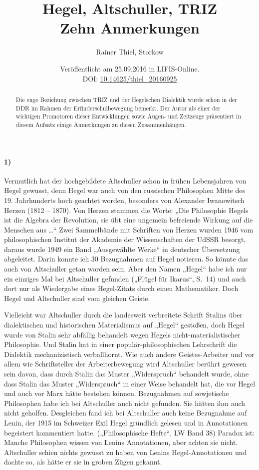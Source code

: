 \documentclass[12pt,a4paper]{article}
\title{Hegel, Altschuller, TRIZ\\[1em]\large Zehn Anmerkungen}
\author{Rainer Thiel, Storkow}
\date{Veröffentlicht am 25.09.2016 in LIFIS-Online.\\[4pt] DOI:
  \url{10.14625/thiel_20160925}}
\begin{document}
\maketitle

\begin{abstract}\noindent
  Die enge Beziehung zwischen TRIZ und der Hegelschen Dialektik wurde schon in
  der DDR im Rahmen der Erfinderschulbewegung bemerkt.  Der Autor als einer
  der wichtigen Promotoren dieser Entwicklungen sowie Augen- und Zeitzeuge
  präsentiert in diesem Aufsatz einige Anmerkungen zu diesen Zusammenhängen.   
\end{abstract}

\paragraph{1)} 
Vermutlich hat der hochgebildete Altschuller schon in frühen Lebensjahren von
Hegel gewusst, denn Hegel war auch von den russischen Philosophen Mitte des
19. Jahrhunderts hoch geachtet worden, besonders von Alexander Iwanowitsch
Herzen (1812 – 1870). Von Herzen stammen die Worte: „Die Philosophie Hegels ist
die Algebra der Revolution, sie übt eine ungemein befreiende Wirkung auf die
Menschen aus …“ Zwei Sammelbände mit Schriften von Herzen wurden 1946 vom
philosophischen Institut der Akademie der Wissenschaften der UdSSR besorgt,
daraus wurde 1949 ein Band „Ausgewählte Werke“ in deutscher Übersetzung
abgeleitet. Darin konnte ich 30 Bezugnahmen auf Hegel notieren. So könnte das
auch von Altschuller getan worden sein. Aber den Namen „Hegel“ habe ich nur ein
einziges Mal bei Altschuller gefunden („Flügel für Ikarus“, S.~14) und auch
dort nur als Wiedergabe eines Hegel-Zitats durch einen Mathematiker. Doch Hegel
und Altschuller sind vom gleichen Geiste.

Vielleicht war Altschuller durch die landesweit verbreitete Schrift Stalins
über dialektischen und historischen Materialismus auf „Hegel“ gestoßen, doch
Hegel wurde von Stalin sehr abfällig behandelt wegen Hegels
nicht-materialistischer Philosophie. Und Stalin hat in einer
populär-philosophischen Lehrschrift die Dialektik mechanizistisch verballhornt.
Wie auch andere Geistes-Arbeiter und vor allem wie Schriftsteller der
Arbeiterbewegung wird Altschuller berührt gewesen sein davon, dass durch Stalin
das Muster „Widerspruch“ behandelt wurde, ohne dass Stalin das Muster
„Widerspruch“ in einer Weise behandelt hat, die vor Hegel und auch vor Marx
hätte bestehen können. Bezugnahmen auf sowjetische Philosophen habe ich bei
Altschuller auch nicht gefunden. Sie hätten ihm auch nicht geholfen.
Desgleichen fand ich bei Altschuller auch keine Bezugnahme auf Lenin, der 1915
im Schweizer Exil Hegel gründlich gelesen und in Annotationen begeistert
kommentiert hatte. („Philosophische Hefte“, LW Band 38) Paradox ist: Manche
Philosophen wissen von Lenins Annotationen, aber achten sie nicht. Altschuller
schien nichts gewusst zu haben von Lenins Hegel-Annotationen und dachte so, als
hätte er sie in groben Zügen gekannt.
\end{document}
